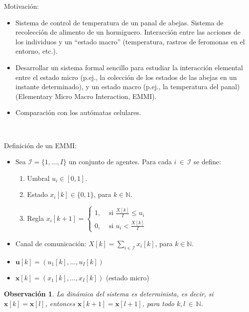 \documentclass{article}
\newtheorem{obs}{Observación}
\begin{document}
Motivación: 
\begin{itemize}
\item Sistema de control de temperatura de un panal de abejas. Sistema de recolección de alimento de un hormiguero. Interacción entre las acciones de los individuos y un ``estado macro'' (temperatura, rastros de feromonas en el entorno, etc.).
\item Desarrollar un sistema formal sencillo para  estudiar la interacción elemental entre el estado micro (p.ej., la colección de los estados de las abejas en un instante determinado), y un estado macro (p.ej., la temperatura del panal) (Elementary Micro Macro Interaction, EMMI). 
\item Comparación con los autómatas celulares.
\end{itemize}

\

Definición de un EMMI:
\begin{itemize}
\item Sea $\mathcal{I}=\{1,\ldots,I\}$ un conjunto de agentes. Para cada $i\,{\in}\,\mathcal{I}$ se define:
	\begin{enumerate}[label=(\alph*)]
	\item Umbral $u_i\in[0,1]$.
	\item Estado $x_i[k]\in\{0, 1\}$, para $k\in\mathbb{N}$.
	\item Regla  $x_i[k+1]=\begin{cases} 1, & \mbox{ si }\frac{X[k]}{I}\leq u_i\\ 0, & \mbox{ si } u_i < \frac{X[k]}{I}\end{cases}$
	\end{enumerate}

\item Canal de comunicación: $X[k]=\sum_{i\in\mathcal{I}} x_i[k]$, para $k\in\mathbb{N}$.
\end{itemize}

\begin{itemize}
\item $\bm{u}[k]= (u_1[k],\ldots,u_I[k])$
\item $\bm{x}[k]= (x_1[k],\ldots,x_I[k])$ (estado micro)
\end{itemize}

\begin{obs}
La dinámica del sistema es determinista, es decir, si $\bm{x}[k]=\bm{x}[l]$, entonces $\bm{x}[k{+}1]=\bm{x}[l{+}1]$, para todo $k,l\,{\in}\,\mathbb{N}$.
\end{obs}
\end{document}
